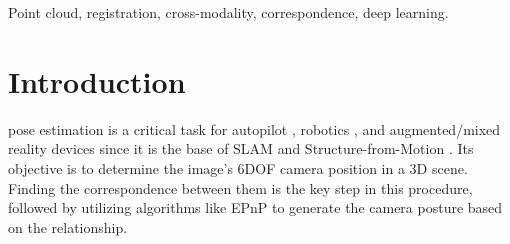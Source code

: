 \documentclass[lettersize,journal]{IEEEtran}
\begin{document}
\begin{IEEEkeywords}
Point cloud, registration, cross-modality, correspondence, deep learning.
\end{IEEEkeywords}

\section{Introduction}
 pose estimation is a critical task for autopilot \cite{AUTOPILOT}, robotics \cite{ROBOTICS}, and augmented/mixed reality \cite{AR} devices since it is the base of SLAM \cite{SLAM2,SLAM} and Structure-from-Motion \cite{SFM}. Its objective is to determine the image's 6DOF camera position in a 3D scene. Finding the correspondence between them is the key step in this procedure, followed by utilizing algorithms like EPnP \cite{EPNP} to generate the camera posture based on the relationship.
\end{document}

